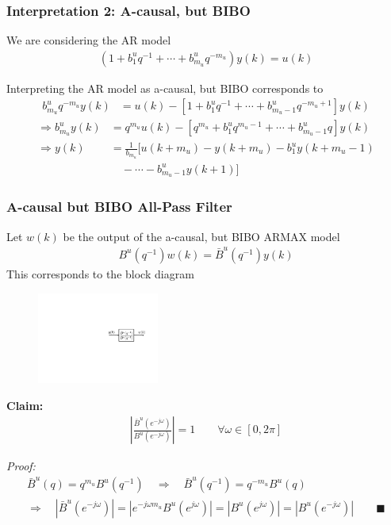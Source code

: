 \begin{frame}
    \frametitle{Interpretation 2: A-causal, but BIBO}

    We are considering the AR model
    \begin{align*}
        (1 + b_1^u q^{-1} + \cdots + b_{m_u}^u q^{-m_u}) y(k) = u(k)
    \end{align*}
    \paused

    Interpreting the AR model as a-causal, but BIBO corresponds to
    \begin{align*}
        b_{m_u}^u q^{-m_u} y(k) & = u(k) - [1 + b_1^u q^{-1} + \cdots + b_{m_u-1}^u q^{-m_u+1}] y(k)
    \end{align*}
    \paused
    \begin{align*}
        \Rightarrow b_{m_u}^u y(k) & = q^{m_u} u(k) - [q^{m_u} + b_1^u q^{m_u-1} + \cdots + b_{m_u-1}^u q] y(k) \\
        \Rightarrow y(k) & = \frac{1}{b_{m_u}} [ u(k+m_u) - y(k+m_u) - b_1^u y(k+m_u-1) \\
        & \quad - \cdots - b_{m_u-1}^u y(k+1) ]
    \end{align*}
    \paused

\end{frame}

\begin{frame}
    \frametitle{A-causal but BIBO All-Pass Filter}

    Let $w(k)$ be the output of the a-causal, but BIBO ARMAX model
    \begin{align*}
        B^u(q^{-1}) w(k) = \bar{B}^u(q^{-1}) y(k)
    \end{align*}
    This corresponds to the block diagram
    \begin{figure}
        \includegraphics[width=4cm]{MVR_figs_ac2}
    \end{figure}
    \pause

    \textbf{Claim:}
    \begin{align*}
        \left| \frac{\bar{B}^u(e^{-j\omega})}{B^u(e^{-j\omega})} \right| = 1 \qquad \forall \omega \in [0,2\pi]
    \end{align*}
    \paused

    \textit{Proof:}
    \begin{gather*}
        \bar{B}^u(q) = q^{m_u} B^u(q^{-1}) \quad \Rightarrow \quad \bar{B}^u(q^{-1}) = q^{-m_u} B^u(q) \\
        \Rightarrow \quad | \bar{B}^u(e^{-j\omega}) | = | e^{-j\omega m_u} B^u(e^{j\omega}) | = | B^u(e^{j\omega}) |
            = | B^u(e^{-j\omega}) | \qquad \blacksquare
    \end{gather*}

\end{frame}

